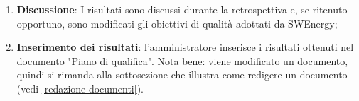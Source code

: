 \begin{itemize}
\begin{enumerate}
		      \item \textbf{Discussione}: I risultati sono discussi durante la
		            retrospettiva e, se ritenuto opportuno, sono modificati
		            gli obiettivi di qualità adottati da SWEnergy;

		      \item \textbf{Inserimento dei risultati}: l'amministratore
		            inserisce i risultati ottenuti nel documento "Piano di
		            qualifica".
		            Nota bene: viene modificato un documento, quindi si rimanda
		            alla sottosezione che illustra come redigere un documento
		            (vedi \autoref{redazione-documenti}).
	      \end{enumerate}
\end{itemize}
